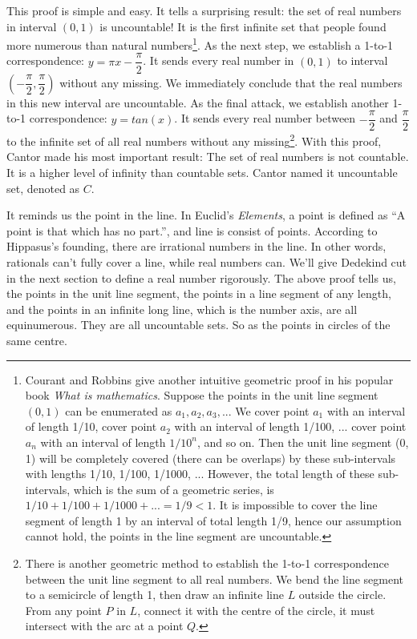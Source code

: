 \documentclass{article}
\begin{document}
This proof is simple and easy. It tells a surprising result: the set of real numbers in interval $(0, 1)$ is uncountable! It is the first infinite set that people found more numerous than natural numbers\footnote{Courant and Robbins give another intuitive geometric proof in his popular book {\em What is mathematics}. Suppose the points in the unit line segment $(0, 1)$ can be enumerated as $a_1, a_2, a_3, ...$ We cover point $a_1$ with an interval of length 1/10, cover point $a_2$ with an interval of length 1/100, ... cover point $a_n$ with an interval of length $1/10^n$, and so on. Then the unit line segment (0, 1) will be completely covered (there can be overlaps) by these sub-intervals with lengths 1/10, 1/100, 1/1000, ... However, the total length of these sub-intervals, which is the sum of a geometric series, is $1/10 + 1/100 + 1/1000 + ... = 1/9 < 1$. It is impossible to cover the line segment of length 1 by an interval of total length 1/9, hence our assumption cannot hold, the points in the line segment are uncountable\cite{Courant1969}.}. As the next step, we establish a 1-to-1 correspondence: $y = \pi x - \dfrac{\pi}{2}$. It sends every real number in $(0, 1)$ to interval $(-\dfrac{\pi}{2}, \dfrac{\pi}{2})$ without any missing. We immediately conclude that the real numbers in this new interval are uncountable. As the final attack, we establish another 1-to-1 correspondence: $ y = tan(x)$. It sends every real number between $-\dfrac{\pi}{2}$ and $\dfrac{\pi}{2}$ to the infinite set of all real numbers without any missing\footnote{There is another geometric method to establish the 1-to-1 correspondence between the unit line segment to all real numbers. We bend the line segment to a semicircle of length 1, then draw an infinite line $L$ outside the circle. From any point $P$ in $L$, connect it with the centre of the circle, it must intersect with the arc at a point $Q$.}. With this proof, Cantor made his most important result: The set of real numbers is not countable. It is a higher level of infinity than countable sets. Cantor named it uncountable set, denoted as $C$.

It reminds us the point in the line. In Euclid's {\em Elements}, a point is defined as ``A point is that which has no part.'', and line is consist of points. According to Hippasus's founding, there are irrational numbers in the line. In other words, rationals can't fully cover a line, while real numbers can. We'll give Dedekind cut in the next section to define a real number rigorously. The above proof tells us, the points in the unit line segment, the points in a line segment of any length, and the points in an infinite long line, which is the number axis, are all equinumerous. They are all uncountable sets. So as the points in circles of the same centre.
\end{document}
